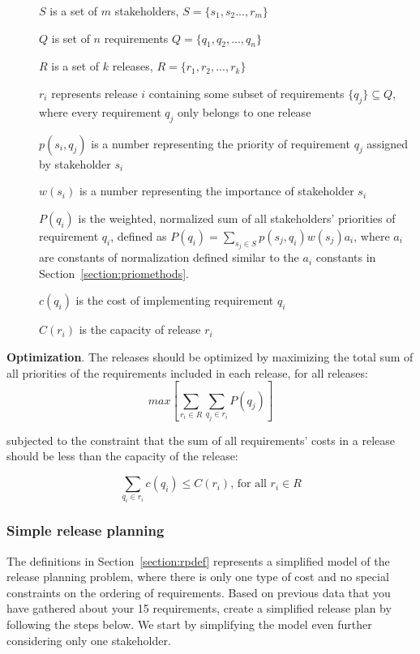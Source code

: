 \documentclass[11pt]{article}
\begin{document}
\begin{description}

\item [] $S$ is a set of $m$ stakeholders, $S=\{s_1, s_2 ..., r_m\}$
\item [] $Q$ is set of $n$ requirements $Q=\{q_1, q_2, ..., q_n\}$
\item [] $R$ is a set of $k$ releases, $R=\{r_1, r_2,  ..., r_k\}$
\item [] $r_i$ represents release $i$ containing some subset of requirements $\{q_j\} \subseteq Q$, where every requirement $q_j$ only belongs to one release
\item [] $p(s_i, q_j)$ is a number representing the priority of requirement $q_j$ assigned by stakeholder $s_i$
\item [] $w(s_i)$ is a number representing the importance of stakeholder $s_i$
\item [] $P(q_i)$ is the weighted, normalized sum of all stakeholders' priorities of requirement $q_i$, defined as $P(q_i) = \sum\limits_{s_j \in S} p(s_j, q_i)w(s_j)a_i$, where $a_i$ are constants of normalization defined similar to the $a_i$ constants in Section~\ref{section:priomethods}.
\item [] $c(q_i)$ is the cost of implementing requirement $q_i$
\item [] $C(r_i)$ is the capacity of release $r_i$
\end{description}

\noindent
{\bf Optimization}. The releases should be optimized by maximizing the total sum of all priorities of the requirements included in each release, for all releases:
\begin{displaymath}
max [ \sum\limits_{r_i \in R} \sum\limits_{q_j \in r_i}P(q_j) ]
\end{displaymath}

\begin{flushleft}subjected to  the constraint that the sum of all requirements' costs in a release should be less than the capacity of the release:\end{flushleft}
\begin{displaymath}
\sum\limits_{q_i \in r_i} c(q_i) \leq C(r_i)\text{,  for all }r_i \in R
\end{displaymath}
\subsubsection{Simple release planning}
The definitions in Section~\ref{section:rpdef} represents a simplified model of the release planning problem, where there is only one type of cost and no special constraints on the ordering of requirements. Based on previous data that you have gathered about your 15 requirements, create a simplified release plan by following the steps below. We start by simplifying the model even further considering only one stakeholder.
\end{document}
